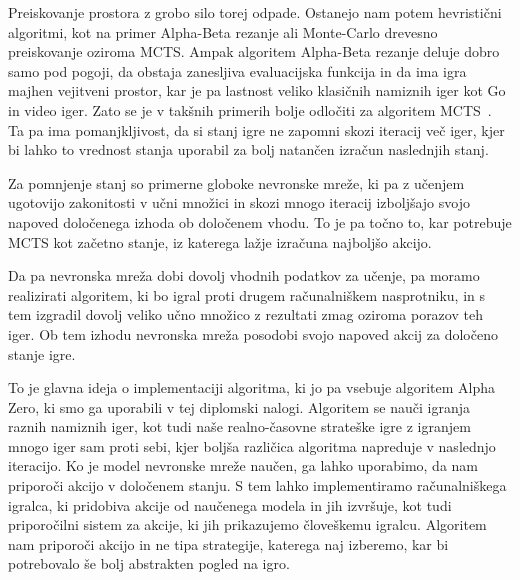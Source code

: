 \documentclass[a4paper, 12pt]{book}
\begin{document}
Preiskovanje prostora z grobo silo torej odpade. 
Ostanejo nam potem hevristični algoritmi, kot na primer Alpha-Beta rezanje ali Monte-Carlo drevesno preiskovanje oziroma MCTS. 
Ampak algoritem Alpha-Beta rezanje deluje dobro samo pod pogoji, da obstaja zanesljiva evaluacijska funkcija in da ima igra majhen vejitveni prostor, kar je pa lastnost veliko klasičnih namiznih iger kot Go in video iger. Zato se je v takšnih primerih bolje odločiti za algoritem MCTS~\cite{chaslot2008monte}.
Ta pa ima pomanjkljivost, da si stanj igre ne zapomni skozi iteracij več iger, kjer bi lahko to vrednost stanja uporabil za bolj natančen izračun naslednjih stanj.

Za pomnjenje stanj so primerne globoke nevronske mreže, ki pa z učenjem ugotovijo zakonitosti v učni množici in skozi mnogo iteracij izboljšajo svojo napoved določenega izhoda ob določenem vhodu. 
To je pa točno to, kar potrebuje MCTS kot začetno stanje, iz katerega lažje izračuna najboljšo akcijo.

Da pa nevronska mreža dobi dovolj vhodnih podatkov za učenje, pa moramo realizirati algoritem, ki bo igral proti drugem računalniškem nasprotniku, in s tem izgradil dovolj veliko učno množico z rezultati zmag oziroma porazov teh iger. 
Ob tem izhodu nevronska mreža posodobi svojo napoved akcij za določeno stanje igre.

To je glavna ideja o implementaciji algoritma, ki jo pa vsebuje algoritem Alpha Zero, ki smo ga uporabili v tej diplomski nalogi.
Algoritem se nauči igranja raznih namiznih iger, kot tudi naše realno-časovne strateške igre z igranjem mnogo iger sam proti sebi, kjer boljša različica algoritma napreduje v naslednjo iteracijo.
Ko je model nevronske mreže naučen, ga lahko uporabimo, da nam priporoči akcijo v določenem stanju.
S tem lahko implementiramo računalniškega igralca, ki pridobiva akcije od naučenega modela in jih izvršuje, kot tudi priporočilni sistem za akcije, ki jih prikazujemo človeškemu igralcu. 
Algoritem nam priporoči akcijo in ne tipa strategije, katerega naj izberemo, kar bi potrebovalo še bolj abstrakten pogled na igro. 
\end{document}
